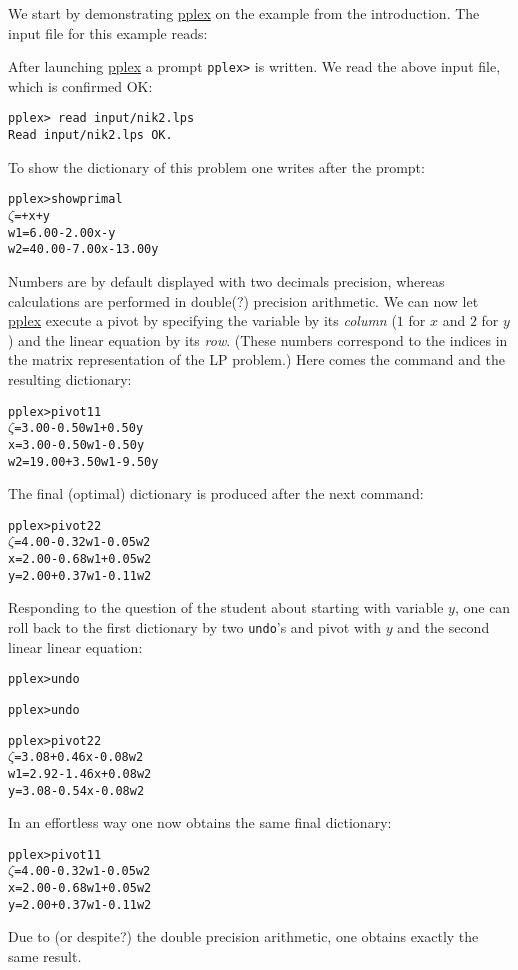 \documentclass[ukenglish]{nik}
\begin{document}
We start by demonstrating \url{pplex} on the example from the introduction.
The input file for this example reads:
\begin{alltt}

\end{alltt}
After launching \url{pplex} a prompt \verb|pplex>| is written.
We read the above input file, which is confirmed OK:
\begin{verbatim}
pplex> read input/nik2.lps
Read input/nik2.lps OK.
\end{verbatim}
To show the dictionary of this problem one writes after the prompt:
\begin{alltt}
pplex> show primal
 \(\zeta\) =       +     x +      y
w1 =  6.00 - 2.00x -      y
w2 = 40.00 - 7.00x - 13.00y
\end{alltt}
Numbers are by default displayed with two decimals precision, whereas
calculations are performed in double(?) precision arithmetic.
We can now let \url{pplex} execute a pivot by specifying
the variable by its \emph{column} ($1$ for $x$ and $2$ for $y$)
and the linear equation by its \emph{row}. (These numbers correspond to
the indices in the matrix representation of the LP problem.)
Here comes the command and the resulting dictionary:
\begin{alltt}
pplex> pivot 1 1
 \(\zeta\) =  3.00 - 0.50w1 + 0.50y
 x =  3.00 - 0.50w1 - 0.50y
w2 = 19.00 + 3.50w1 - 9.50y
\end{alltt}
The final (optimal) dictionary is produced after the next command:
\begin{alltt}
pplex> pivot 2 2
 \(\zeta\) = 4.00 - 0.32w1 - 0.05w2
 x = 2.00 - 0.68w1 + 0.05w2
 y = 2.00 + 0.37w1 - 0.11w2
\end{alltt}
Responding to the question of the student about starting with variable $y$, 
one can roll back to the first dictionary by two \verb|undo|'s and pivot
with $y$ and the second linear linear equation:
\begin{alltt}
pplex> undo

pplex> undo

pplex> pivot 2 2
 \(\zeta\) = 3.08 + 0.46x - 0.08w2
w1 = 2.92 - 1.46x + 0.08w2
 y = 3.08 - 0.54x - 0.08w2
\end{alltt}
In an effortless way one now obtains the same final dictionary:
\begin{alltt}
pplex> pivot 1 1 
 \(\zeta\) = 4.00 - 0.32w1 - 0.05w2
 x = 2.00 - 0.68w1 + 0.05w2
 y = 2.00 + 0.37w1 - 0.11w2
\end{alltt}
Due to (or despite?) the double precision arithmetic, one obtains exactly the same result.
\end{document}
